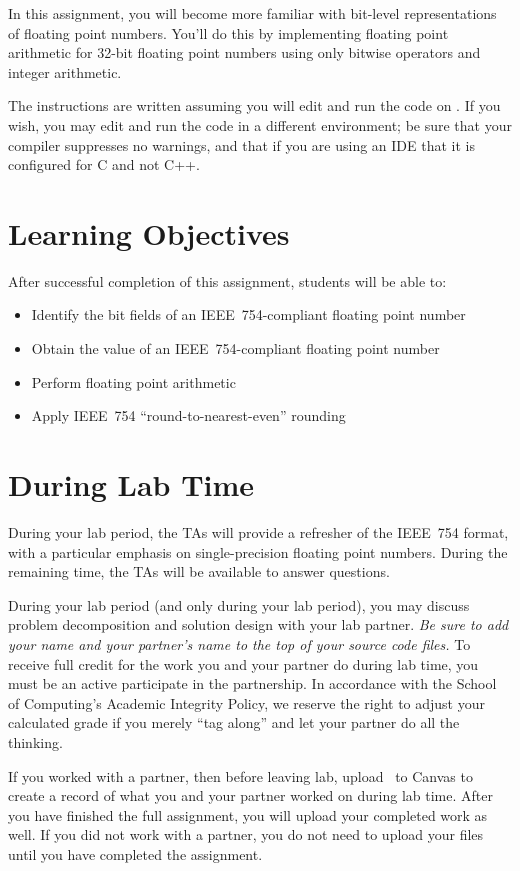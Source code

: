 In this assignment, you will become more familiar with bit-level representations of floating point numbers.
You'll do this by implementing floating point arithmetic for 32-bit floating point numbers using only bitwise operators and integer arithmetic.

The instructions are written assuming you will edit and run the code on \runtimeenvironment.
If you wish, you may edit and run the code in a different environment;
be sure that your compiler suppresses no warnings, and that if you are using an IDE that it is configured for C and not C++.

\tableofcontents

\section*{Learning Objectives}

After successful completion of this assignment, students will be able to:
\begin{itemize}
    \item Identify the bit fields of an IEEE~754-compliant floating point number
    \item Obtain the value of an IEEE~754-compliant floating point number
    \item Perform floating point arithmetic
    \item Apply IEEE~754 ``round-to-nearest-even'' rounding
\end{itemize}

\section*{During Lab Time}

During your lab period, the TAs will provide a refresher of the IEEE~754 format, with a particular emphasis on single-precision floating point numbers.
During the remaining time, the TAs will be available to answer questions.

During your lab period (and only during your lab period), you may discuss problem decomposition and solution design with your lab partner.
\textit{Be sure to add your name and your partner's name to the top of your source code files.}
To receive full credit for the work you and your partner do during lab time, you must be an active participate in the partnership.
In accordance with the School of Computing's Academic Integrity Policy, we reserve the right to adjust your calculated grade if you merely ``tag along'' and let your partner do all the thinking.

If you worked with a partner, then before leaving lab, upload \requiredfiles\ to Canvas to create a record of what you and your partner worked on during lab time.
After you have finished the full assignment, you will upload your completed work as well.
If you did not work with a partner, you do not need to upload your files until you have completed the assignment.